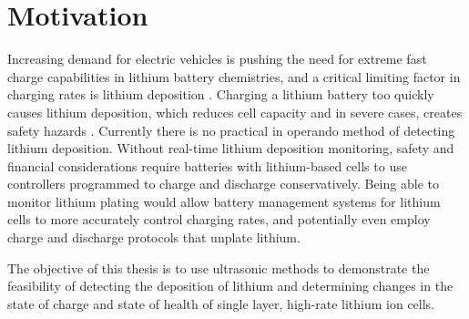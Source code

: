\section{Motivation}
Increasing demand for electric vehicles is pushing the need for extreme fast charge capabilities in lithium battery chemistries, and a critical limiting factor in charging rates is lithium deposition \cite{XFC}. Charging a lithium battery too quickly causes lithium deposition, which reduces cell capacity and in severe cases, creates safety hazards \cite{XFC}. Currently there is no practical in operando method of detecting lithium deposition. Without real-time lithium deposition monitoring, safety and financial considerations require batteries with lithium-based cells to use controllers programmed to charge and discharge conservatively. Being able to monitor lithium plating would allow battery management systems for lithium cells to more accurately control charging rates, and potentially even employ charge and discharge protocols that unplate lithium.

The objective of this thesis is to use ultrasonic methods to demonstrate the feasibility of detecting the deposition of lithium and determining changes in the state of charge and state of health of single layer, high-rate lithium ion cells.